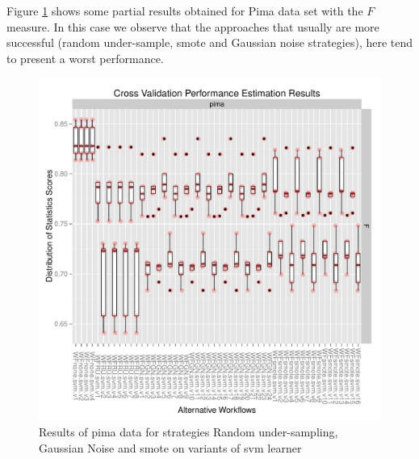 \documentclass[10pt,a4paper]{article}\usepackage[]{graphicx}\usepackage[]{color}
\makeatletter
\def\maxwidth{ %
  \ifdim\Gin@nat@width>\linewidth
    \linewidth
  \else
    \Gin@nat@width
  \fi
}
\newenvironment{knitrout}{}{} %
\makeatother
\begin{document}
Figure \ref{fig:pima_plot1} shows some partial results obtained for Pima data set with the $F$ measure. In this case we observe that the approaches that usually are more successful (random under-sample, smote and Gaussian noise strategies), here tend to present a worst performance.
\begin{knitrout}\footnotesize
{}\color{fgcolor}\begin{figure}

{\centering \includegraphics[width=\maxwidth]{figures/UBL-pima_plot1-1} 

}

\caption[Results of pima data for strategies Random under-sampling, Gaussian Noise and smote on variants of svm learner]{Results of pima data for strategies Random under-sampling, Gaussian Noise and smote on variants of svm learner}\label{fig:pima_plot1}
\end{figure}


\end{knitrout}
\end{document}
